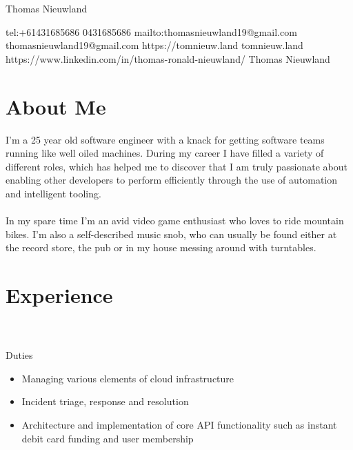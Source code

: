\documentclass{resume}
\begin{document}
\ContactName
{Thomas Nieuwland}

\ContactInfoDigital
  {tel:+61431685686}
  {0431685686}
  {mailto:thomasnieuwland19@gmail.com}
  {thomasnieuwland19@gmail.com}
  {https://tomnieuw.land}
  {tomnieuw.land}
  {https://www.linkedin.com/in/thomas-ronald-nieuwland/}
  {Thomas Nieuwland}

\section{{\faUser} About Me}
I'm a 25 year old software engineer with a knack for getting software teams running like well oiled machines. During my 
career I have filled a variety of different roles, which has helped me to discover that I am truly passionate about 
enabling other developers to perform efficiently through the use of automation and intelligent tooling.
\\~\\
In my spare time I'm an avid video game enthusiast who loves to ride mountain bikes. I'm also a self-described music
snob, who can usually be found either at the record store, the pub or in my house messing around with turntables.

\section{{\faBriefcase} Experience}
 \\
 \\
Duties \\
\begin{itemize}
  \item Managing various elements of cloud infrastructure
  \item Incident triage, response and resolution
  \item Architecture and implementation of core API functionality such as instant debit card funding and user membership
\end{itemize}
\end{document}
